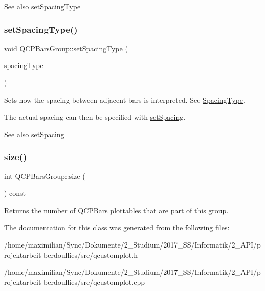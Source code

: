 \begin{DoxySeeAlso}{See also}
\hyperlink{class_q_c_p_bars_group_a2c7e2d61b10594a4555b615e1fcaf49e}{set\+Spacing\+Type} 
\end{DoxySeeAlso}
\mbox{\label{class_q_c_p_bars_group_a2c7e2d61b10594a4555b615e1fcaf49e}} 
\subsubsection{\texorpdfstring{set\+Spacing\+Type()}{setSpacingType()}}
{\footnotesize\ttfamily void Q\+C\+P\+Bars\+Group\+::set\+Spacing\+Type (\begin{DoxyParamCaption}\item[{\hyperlink{class_q_c_p_bars_group_a4c0521120a97e60bbca37677a37075b6}{Spacing\+Type}}]{spacing\+Type }\end{DoxyParamCaption})}

Sets how the spacing between adjacent bars is interpreted. See \hyperlink{class_q_c_p_bars_group_a4c0521120a97e60bbca37677a37075b6}{Spacing\+Type}.

The actual spacing can then be specified with \hyperlink{class_q_c_p_bars_group_aa553d327479d72a0c3dafcc724a190e2}{set\+Spacing}.

\begin{DoxySeeAlso}{See also}
\hyperlink{class_q_c_p_bars_group_aa553d327479d72a0c3dafcc724a190e2}{set\+Spacing} 
\end{DoxySeeAlso}
\mbox{\label{class_q_c_p_bars_group_a3780ec77919cb00840207ec7a0f00dd5}} 
\subsubsection{\texorpdfstring{size()}{size()}}
{\footnotesize\ttfamily int Q\+C\+P\+Bars\+Group\+::size (\begin{DoxyParamCaption}{ }\end{DoxyParamCaption}) const\hspace{0.3cm}{\ttfamily [inline]}}

Returns the number of \hyperlink{class_q_c_p_bars}{Q\+C\+P\+Bars} plottables that are part of this group. 

The documentation for this class was generated from the following files\+:\begin{DoxyCompactItemize}
\item 
/home/maximilian/\+Sync/\+Dokumente/2\+\_\+\+Studium/2017\+\_\+\+S\+S/\+Informatik/2\+\_\+\+A\+P\+I/projektarbeit-\/berdoullies/src/qcustomplot.\+h\item 
/home/maximilian/\+Sync/\+Dokumente/2\+\_\+\+Studium/2017\+\_\+\+S\+S/\+Informatik/2\+\_\+\+A\+P\+I/projektarbeit-\/berdoullies/src/qcustomplot.\+cpp\end{DoxyCompactItemize}
